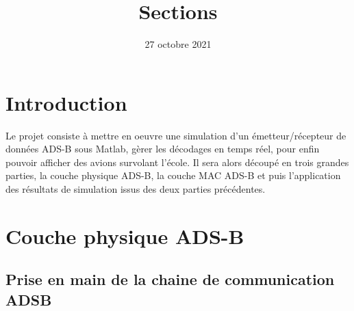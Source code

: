 \documentclass{rapport}
\begin{document}





        
\fairemarges %
\fairepagedegarde %


\title{Sections}
\date{27 octobre 2021}

\renewcommand\contentsname{\Huge Sommaire \\ }

\maketitle

\tableofcontents

\newpage
\section{\Large Introduction}

Le projet consiste à mettre en oeuvre une simulation d'un émetteur/récepteur de données ADS-B sous Matlab, gèrer les décodages en temps réel, pour enfin pouvoir afficher des avions survolant l'école.
Il sera alors découpé en trois grandes parties, la couche physique ADS-B, la couche MAC ADS-B et puis l'application des résultats de simulation issus des deux parties précédentes.
\section{\Large Couche physique ADS-B}
\subsection{\Large Prise en main de la chaine de communication ADSB}
\end{document}
